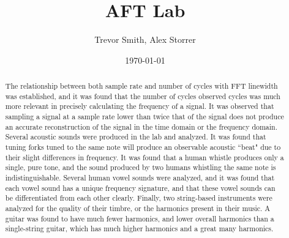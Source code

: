 \documentclass[aps,prl,reprint]{revtex4-2}
\begin{document}

\title{AFT Lab}


\author{Trevor Smith, Alex Storrer}


\date{\today}

\begin{abstract}
	The relationship between both sample rate and number of cycles
	with FFT linewidth was established, and it was found that 
	the number of cycles observed cycles was much more relevant
	in precisely calculating the frequency of a signal.
	It was observed that sampling a signal at a sample rate
	lower than twice that of the signal does not produce
	an accurate reconstruction of the signal in the time
	domain or the frequency domain. Several acoustic sounds
	were produced in the lab and analyzed. It was found that tuning forks
	tuned to the same note will produce an observable acoustic
	``beat" due to their slight differences in frequency. 
	It was found that a human whistle produces only a single,
	pure tone, and the sound produced by two humans whistling 
	the same note is indistinguishable. Several human vowel
	sounds were analyzed, and it was found that each vowel
	sound has a unique frequency signature, and that these
	vowel sounds can be differentiated from each other clearly.
	Finally, two string-based instruments were analyzed for the
	quality of their timbre, or the harmonics present in their
	music. A guitar was found to have much fewer harmonics, and
	lower overall harmonics than a single-string guitar, which
	has much higher harmonics and a great many harmonics.
\end{abstract}
\end{document}
